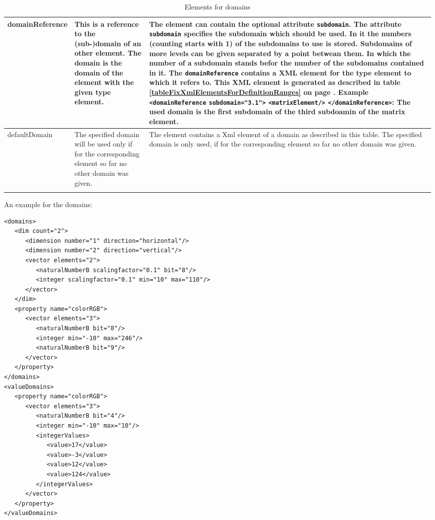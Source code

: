 \begin{center}
\begin{longtable}{|p{25mm}|p{25mm}|p{75mm}|}
	domainReference & This is a reference to the (sub-)domain of an other element. The domain is the domain of the element with the given type element. & The element can contain the optional attribute \verb|subdomain|. The attribute \verb|subdomain| specifies the subdomain which should be used. In it the numbers (counting starts with 1) of the subdomains to use is stored.  Subdomains of more levels can be given separated by a point betwean them. In which the number of a subdomain stands befor the number of the subdomains contained in it. The \verb|domainReference| contains a XML element for the type element to which it refers to. This XML element is generated as described in table \ref{tableFixXmlElementsForDefinitionRanges} on page \pageref{tableFixXmlElementsForDefinitionRanges} . Example \verb|<domainReference| \verb|subdomain="3.1">| \verb|<matrixElement/>| \verb|</domainReference>|: The used domain is the first subdomain of the third subdoamin of the matrix element.\\\hline

	defaultDomain & The specified domain will be used only if for the corresponding element so far no other domain was given. & The element contains a Xml element of a domain as described in this table. The specified domain is only used, if for the corresponding element so far no other domain was given.\\\hline

\caption{Elements for domains}
\label{tableXmlDefinitionRanges}
\end{longtable}
\end{center}

\bigskip\noindent
An example for the domains:
\begin{verbatim}
<domains>
   <dim count="2">
      <dimension number="1" direction="horizontal"/>
      <dimension number="2" direction="vertical"/>
      <vector elements="2">
         <naturalNumberB scalingfactor="0.1" bit="8"/>
         <integer scalingfactor="0.1" min="10" max="110"/>
      </vector>
   </dim>
   <property name="colorRGB">
      <vector elements="3">
         <naturalNumberB bit="8"/>
         <integer min="-10" max="246"/>
         <naturalNumberB bit="9"/>
      </vector>
   </property>
</domains>
<valueDomains>
   <property name="colorRGB">
      <vector elements="3">
         <naturalNumberB bit="4"/>
         <integer min="-10" max="10"/>
         <integerValues>
            <value>17</value>
            <value>-3</value>
            <value>12</value>
            <value>124</value>
         </integerValues>
      </vector>
   </property>
</valueDomains>
\end{verbatim}

